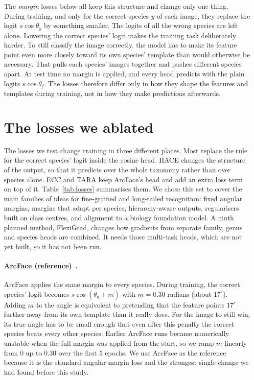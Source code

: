\documentclass[11pt]{article}
\begin{document}
The \emph{margin} losses below all keep this structure and change only one thing. During
training, and only for the correct species $y$ of each image, they replace the logit
$s\cos\theta_y$ by something smaller. The logits of all the wrong species are left
alone. Lowering the correct species' logit makes the training task deliberately harder.
To still classify the image correctly, the model has to make its feature point even more
closely toward its own species' template than would otherwise be necessary. That pulls
each species' images together and pushes different species apart. At test time no margin
is applied, and every head predicts with the plain logits $s\cos\theta_j$. The losses
therefore differ only in how they shape the features and templates during training, not
in how they make predictions afterwards.

\section{The losses we ablated}
\label{sec:losses}

The losses we test change training in three different places. Most replace the rule for
the correct species' logit inside the cosine head. HACE changes the structure of the
output, so that it predicts over the whole taxonomy rather than over species alone. ECC
and TARA keep ArcFace's head and add an extra loss term on top of it.
Table~\ref{tab:losses} summarises them. We chose this set to cover the main families of
ideas for fine-grained and long-tailed recognition: fixed angular margins, margins that
adapt per species, hierarchy-aware outputs, regularisers built on class centres, and
alignment to a biology foundation model. A ninth planned method, FlexiGrad, changes how
gradients from separate family, genus and species heads are combined. It needs those
multi-task heads, which are not yet built, so it has not been run.

\paragraph{ArcFace (reference)~\citep{arcface}.} ArcFace applies the same margin to every
species. During training, the correct species' logit becomes $s\cos(\theta_y + m)$ with
$m = 0.30$ radians (about $17^\circ$). Adding $m$ to the angle is equivalent to
pretending that the feature points $17^\circ$ further away from its own template than it
really does. For the image to still win, its true angle has to be small enough that
even after this penalty the correct species beats every other species. Earlier ArcFace
runs became numerically unstable when the full margin was applied from the start, so we
ramp $m$ linearly from 0 up to 0.30 over the first 5 epochs. We use ArcFace as the
reference because it is the standard angular-margin loss and the strongest single change
we had found before this study.
\end{document}
